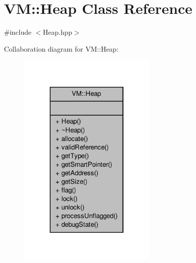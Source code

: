 \hypertarget{class_v_m_1_1_heap}{\section{V\-M\-:\-:Heap Class Reference}
\label{class_v_m_1_1_heap}
}


{\ttfamily \#include $<$Heap.\-hpp$>$}



Collaboration diagram for V\-M\-:\-:Heap\-:
\nopagebreak
\begin{figure}[H]
\begin{center}
\leavevmode
\includegraphics[width=190pt]{class_v_m_1_1_heap__coll__graph}
\end{center}
\end{figure}
